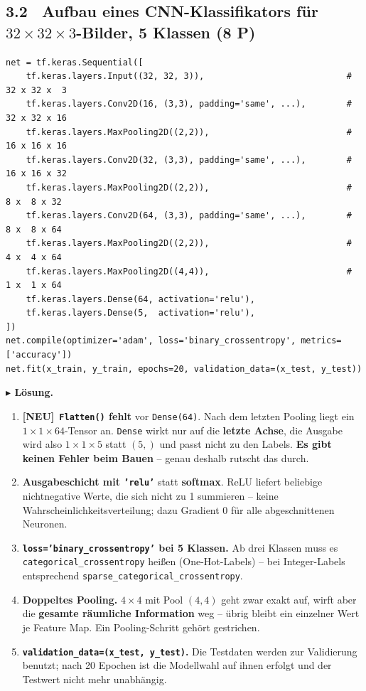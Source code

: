 \documentclass[10pt,a4paper]{article}
\newcommand{\pkt}[1]{\hfill\textbf{(#1 P)}}
\newcommand{\neu}{{\color{neurot}\footnotesize\bfseries[NEU]}\ }
\newenvironment{loes}%
  {\par\vspace{2pt}\begingroup\small\noindent\textbf{\color{loesfarbe}$\blacktriangleright$ Lösung.}\ }%
  {\endgroup\par\vspace{5pt}}
\begin{document}
\newpage
\subsection*{3.2 \ Aufbau eines CNN-Klassifikators für $32\times32\times3$-Bilder, 5 Klassen \pkt{8}}

\begin{lstlisting}
net = tf.keras.Sequential([
    tf.keras.layers.Input((32, 32, 3)),                            # 32 x 32 x  3
    tf.keras.layers.Conv2D(16, (3,3), padding='same', ...),        # 32 x 32 x 16
    tf.keras.layers.MaxPooling2D((2,2)),                           # 16 x 16 x 16
    tf.keras.layers.Conv2D(32, (3,3), padding='same', ...),        # 16 x 16 x 32
    tf.keras.layers.MaxPooling2D((2,2)),                           #  8 x  8 x 32
    tf.keras.layers.Conv2D(64, (3,3), padding='same', ...),        #  8 x  8 x 64
    tf.keras.layers.MaxPooling2D((2,2)),                           #  4 x  4 x 64
    tf.keras.layers.MaxPooling2D((4,4)),                           #  1 x  1 x 64
    tf.keras.layers.Dense(64, activation='relu'),
    tf.keras.layers.Dense(5,  activation='relu'),
])
net.compile(optimizer='adam', loss='binary_crossentropy', metrics=['accuracy'])
net.fit(x_train, y_train, epochs=20, validation_data=(x_test, y_test))
\end{lstlisting}

\begin{loes}
\begin{enumerate}
\item \neu \textbf{\texttt{Flatten()} fehlt} vor \texttt{Dense(64)}. Nach dem letzten Pooling liegt
  ein $1\!\times\!1\!\times\!64$-Tensor an. \texttt{Dense} wirkt nur auf die \textbf{letzte Achse},
  die Ausgabe wird also $1\!\times\!1\!\times\!5$ statt $(5,)$ und passt nicht zu den Labels.
  \textbf{Es gibt keinen Fehler beim Bauen} -- genau deshalb rutscht das durch.
\item \textbf{Ausgabeschicht mit \texttt{'relu'}} statt \textbf{softmax}. ReLU liefert beliebige
  nichtnegative Werte, die sich nicht zu 1 summieren -- keine Wahrscheinlichkeitsverteilung; dazu
  Gradient 0 für alle abgeschnittenen Neuronen.
\item \textbf{\texttt{loss='binary\_crossentropy'} bei 5 Klassen.} Ab drei Klassen muss es
  \texttt{categorical\_crossentropy} heißen (One-Hot-Labels) -- bei Integer-Labels
  entsprechend \texttt{sparse\_}\discretionary{}{}{}\texttt{categorical\_crossentropy}.
\item \textbf{Doppeltes Pooling.} $4\!\times\!4$ mit Pool $(4,4)$ geht zwar exakt auf, wirft aber
  die \textbf{gesamte räumliche Information} weg -- übrig bleibt ein einzelner Wert je Feature Map.
  Ein Pooling-Schritt gehört gestrichen.
\item \textbf{\texttt{validation\_data=(x\_test, y\_test)}.} Die Testdaten werden zur
  Validierung benutzt; nach 20 Epochen ist die Modellwahl auf ihnen erfolgt und der Testwert nicht
  mehr unabhängig.
\end{enumerate}
\end{loes}
\end{document}

